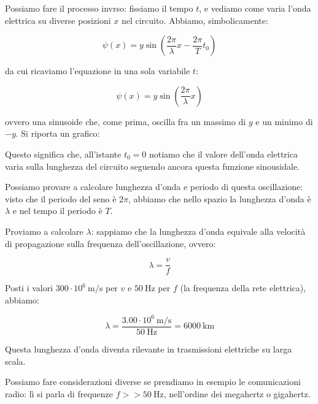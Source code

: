 \documentclass[a4paper,11pt]{article}
\begin{document}
Possiamo fare il processo invrso: fissiamo il tempo $t$, e vediamo come varia l'onda elettrica su diverse posizioni $x$ nel circuito.
Abbiamo, simbolicamente:

$$
	\psi(x) = y \sin{\left( \frac{2\pi}{\lambda}x - \frac{2\pi}{T} t_0 \right)}
$$

da cui ricaviamo l'equazione in una sola variabile $t$:

$$
	\psi(x) = y \sin{\left( \frac{2\pi}{\lambda}x \right)}
$$

ovvero una sinusoide che, come prima, oscilla fra un massimo di $y$ e un minimo di $-y$.
Si riporta un grafico:

\begin{center}
\end{center}

Questo significa che, all'istante $t_0 = 0$ notiamo che il valore dell'onda elettrica varia sulla lunghezza del circuito seguendo ancora questa funzione sinousidale.

Possiamo provare a calcolare lunghezza d'onda e periodo di questa oscillazione: visto che il periodo del seno è $2\pi$, abbiamo che nello spazio la lunghezza d'onda è $\lambda$ e nel tempo il periodo è $T$.

Proviamo a calcolare $\lambda$: sappiamo che la lunghezza d'onda equivale alla velocità di propagazione sulla frequenza dell'oscillazione, ovvero:

$$
\lambda = \frac{v}{f}
$$

Posti i valori $300 \cdot 10^6 \ \mathrm{m/s}$ per $v$ e $50 \ \text{Hz}$ per $f$ (la frequenza della rete elettrica), abbiamo:

$$
\lambda = \frac{3.00 \cdot 10^6 \ \mathrm{m/s}}{50 \ \text{Hz}} = 6000 \ \text{km} 
$$

Questa lunghezza d'onda diventa rilevante in trasmissioni elettriche su larga scala.

Possiamo fare considerazioni diverse se prendiamo in esempio le comunicazioni radio: lì si parla di frequenze $f >> 50 \ \text{Hz}$, nell'ordine dei megahertz o gigahertz.
\end{document}
